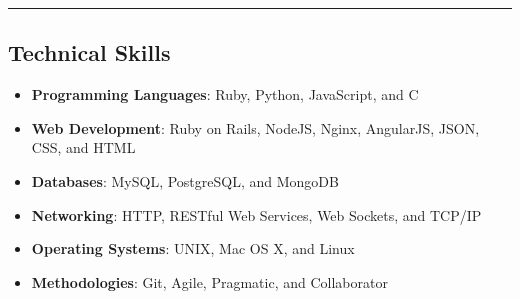 \documentclass[12pt,letterpaper]{article}
\begin{document}
%
%
%
%












\noindent\rule{7.5in}{0.4pt}

\subsection*{Technical Skills}

\begin{itemize}

  \item\textbf{Programming Languages}: Ruby, Python, JavaScript, and C
  \item\textbf{Web Development}: Ruby on Rails, NodeJS, Nginx, AngularJS, JSON, CSS, and HTML
  \item\textbf{Databases}: MySQL, PostgreSQL, and MongoDB
  \item\textbf{Networking}: HTTP, RESTful Web Services, Web Sockets, and TCP/IP
  \item\textbf{Operating Systems}: UNIX, Mac OS X, and Linux
  \item\textbf{Methodologies}: Git, Agile, Pragmatic, and Collaborator

\end{itemize}
\end{document}
